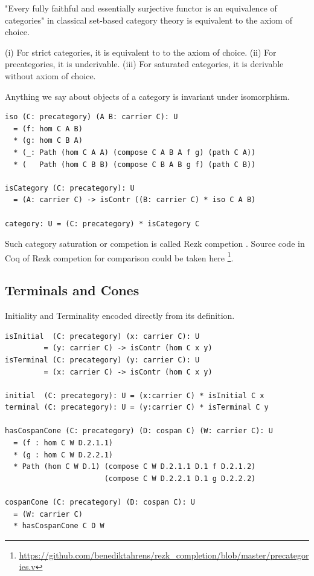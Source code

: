 \documentclass{article}
\begin{document}
"Every fully faithful and essentially surjective functor
is an equivalence of categories" in classical set-based category
theory is equivalent to the axiom of choice.

(i) For strict categories, it is equivalent to to the axiom of choice.
(ii) For precategories, it is underivable.
(iii) For saturated categories, it is derivable without axiom of choice.

Anything we say about objects of a category is invariant under isomorphism.

\begin{lstlisting}
iso (C: precategory) (A B: carrier C): U
  = (f: hom C A B)
  * (g: hom C B A)
  * (_: Path (hom C A A) (compose C A B A f g) (path C A))
  * (   Path (hom C B B) (compose C B A B g f) (path C B))

isCategory (C: precategory): U
  = (A: carrier C) -> isContr ((B: carrier C) * iso C A B)

category: U = (C: precategory) * isCategory C
\end{lstlisting}

Such category saturation or competion is called Rezk competion \cite{Shulman15}.
Source code in Coq of Rezk competion for comparison could be taken here \footnote{\url{https://github.com/benediktahrens/rezk_completion/blob/master/precategories.v}}.

\subsection{Terminals and Cones}

Initiality and Terminality encoded directly from its definition.

\begin{lstlisting}[mathescape=true]
isInitial  (C: precategory) (x: carrier C): U
         = (y: carrier C) -> isContr (hom C x y)
isTerminal (C: precategory) (y: carrier C): U
         = (x: carrier C) -> isContr (hom C x y)

initial  (C: precategory): U = (x:carrier C) * isInitial C x
terminal (C: precategory): U = (y:carrier C) * isTerminal C y

hasCospanCone (C: precategory) (D: cospan C) (W: carrier C): U
  = (f : hom C W D.2.1.1)
  * (g : hom C W D.2.2.1)
  * Path (hom C W D.1) (compose C W D.2.1.1 D.1 f D.2.1.2)
                       (compose C W D.2.2.1 D.1 g D.2.2.2)

cospanCone (C: precategory) (D: cospan C): U
  = (W: carrier C)
  * hasCospanCone C D W
\end{lstlisting}
\end{document}
